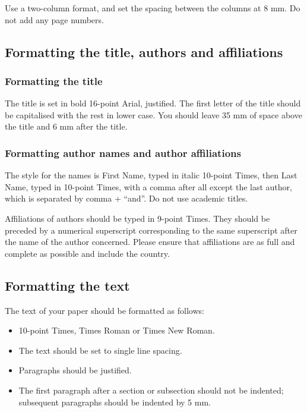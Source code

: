 \documentclass[twocolumn]{webofc}
\begin{document}
Use a two-column format, and set the spacing between the columns at 8 mm.
Do not add any page numbers.

\subsection{Formatting the title, authors and affiliations}\label{sec:formatting}
\subsubsection{Formatting the title}\label{sec:formatting-title}
The title is set in bold 16-point Arial, justified.
The first letter of the title should be capitalised with the rest in lower case.
You should leave 35 mm of space above the title and 6 mm after the title.
\subsubsection{Formatting author names and author affiliations}\label{sec:formatting-author}
The style for the names is First Name, typed in italic 10-point Times, then Last Name, typed in 10-point Times, with a comma after all except the last author, which is separated by comma + ``and''.
Do not use academic titles.

Affiliations of authors should be typed in 9-point Times.
They should be preceded by a numerical superscript corresponding to the same superscript after the name of the author concerned.
Please ensure that affiliations are as full and complete as possible and include the country.
\subsection{Formatting the text}\label{sec:formatting-text}
The text of your paper should be formatted as follows:
\begin{itemize}
\item 10-point Times, Times Roman or Times New Roman.
\item The text should be set to single line spacing.
\item Paragraphs should be justified. 
\item The first paragraph after a section or subsection should not be indented;
  subsequent paragraphs should be indented by 5 mm.
\end{itemize}
\end{document}
